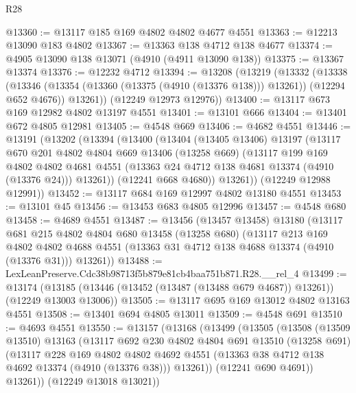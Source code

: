 \begin{lexlean}{R28}
\begin{coremodule}
@13360 := @13117 @185 @169 @4802 @4802 @4677 @4551
@13363 := @12213 @13090 @183 @4802
@13367 := @13363 @138 @4712 @138 @4677
@13374 := @4905 @13090 @138 @13071 (@4910 (@4911 @13090 @138))
@13375 := @13367 @13374
@13376 := @12232 @4712
@13394 := @13208
    (@13219
      (@13332
        (@13338
          (@13346 (@13354 (@13360 (@13375 (@4910 (@13376 @138))) @13261)) (@12294 @652 @4676))
          @13261))
      (@12249 @12973 @12976))
@13400 := @13117 @673 @169 @12982 @4802 @13197 @4551
@13401 := @13101 @666
@13404 := @13401 @672 @4805 @12981
@13405 := @4548 @669
@13406 := @4682 @4551
@13446 := @13191
    (@13202
      (@13394
        (@13400
          (@13404
            (@13405 @13406)
            @13197
            (@13117
              @670
              @201
              @4802
              @4804
              @669
              @13406
              (@13258 @669)
              (@13117
                @199
                @169
                @4802
                @4802
                @4681
                @4551
                (@13363 @24 @4712 @138 @4681 @13374 (@4910 (@13376 @24)))
                @13261))
            (@12241 @668 @4680))
          @13261))
      (@12249 @12988 @12991))
@13452 := @13117 @684 @169 @12997 @4802 @13180 @4551
@13453 := @13101 @45
@13456 := @13453 @683 @4805 @12996
@13457 := @4548 @680
@13458 := @4689 @4551
@13487 := @13456
    (@13457 @13458)
    @13180
    (@13117
      @681
      @215
      @4802
      @4804
      @680
      @13458
      (@13258 @680)
      (@13117
        @213
        @169
        @4802
        @4802
        @4688
        @4551
        (@13363 @31 @4712 @138 @4688 @13374 (@4910 (@13376 @31)))
        @13261))
@13488 := LexLeanPreserve.Cdc38b98713f5b879e81cb4baa751b871.R28.__rel_4
@13499 := @13174
    (@13185 (@13446 (@13452 (@13487 (@13488 @679 @4687)) @13261)) (@12249 @13003 @13006))
@13505 := @13117 @695 @169 @13012 @4802 @13163 @4551
@13508 := @13401 @694 @4805 @13011
@13509 := @4548 @691
@13510 := @4693 @4551
@13550 := @13157
    (@13168
      (@13499
        (@13505
          (@13508
            (@13509 @13510)
            @13163
            (@13117
              @692
              @230
              @4802
              @4804
              @691
              @13510
              (@13258 @691)
              (@13117
                @228
                @169
                @4802
                @4802
                @4692
                @4551
                (@13363 @38 @4712 @138 @4692 @13374 (@4910 (@13376 @38)))
                @13261))
            (@12241 @690 @4691))
          @13261))
      (@12249 @13018 @13021))

\end{coremodule}
\end{lexlean}
